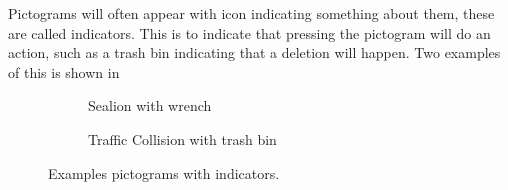 Pictograms will often appear with icon indicating something about them, these are called indicators. 
This is to indicate that pressing the pictogram will do an action, such as a trash bin indicating that a deletion will happen. 
Two examples of this is shown in~

\begin{figure}[H]
    \centering
    \begin{subfigure}[b]{0.2\textwidth}
        \caption{Sealion with wrench}
        \label{fig:sealion}
    \end{subfigure}
    \qquad 
    \begin{subfigure}[b]{0.2\textwidth}
        \caption{Traffic Collision with trash bin}
        \label{fig:trafficcollision}
    \end{subfigure}
    \caption{Examples pictograms with indicators.}\label{fig:pictograms_with_indicators}
\end{figure}